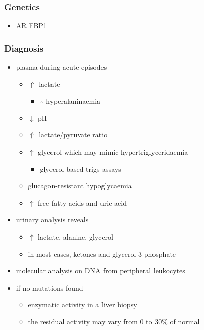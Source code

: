 \documentclass[12pt]{scrartcl}
\begin{document}
\subsubsection{Genetics}
\label{sec:orgf5dcbda}
\begin{itemize}
\item AR FBP1
\end{itemize}

\subsubsection{Diagnosis}
\label{sec:orgdbf12ee}
\begin{itemize}
\item plasma during acute episodes
\begin{itemize}
\item \(\Uparrow\) lactate
\begin{itemize}
\item \(\therefore\) hyperalaninaemia
\end{itemize}
\item \(\downarrow\) pH
\item \(\Uparrow\) lactate/pyruvate ratio
\item \(\uparrow\) glycerol which may mimic hypertriglyceridaemia
\begin{itemize}
\item glycerol based trigs assays
\end{itemize}
\item glucagon-resistant hypoglycaemia
\item \(\uparrow\) free fatty acids and uric acid
\end{itemize}
\item urinary analysis reveals
\begin{itemize}
\item \(\uparrow\) lactate, alanine, glycerol
\item in most cases, ketones and glycerol-3-phosphate
\end{itemize}

\item molecular analysis on DNA from peripheral leukocytes
\item if no mutations found
\begin{itemize}
\item enzymatic activity in a liver biopsy
\item the residual activity may vary from 0 to 30\% of normal
\end{itemize}
\end{itemize}
\end{document}

